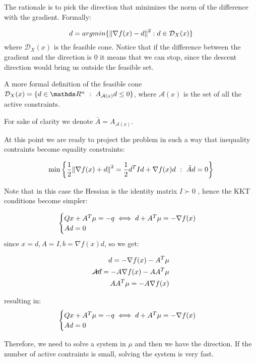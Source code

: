\documentclass[ComputationalMathematics.tex]{subfiles}
\begin{document}
The rationale is to pick the direction that minimizes the norm of the difference with the gradient. Formally:


\[
  d = argmin \{ {\left\lVert\nabla f(x) - d\right\rVert}^2: d \in \mathcal{D}_X(x)\}
\]
where $\mathcal{D}_X(x)$ is the feasible cone. Notice that if the difference between the gradient and the direction is $0$ it means that we can stop, since the descent direction would bring us outside the feasible set.

A more formal definition of the feasible cone $\mathcal{D}_X(x) = \{ d \in \R^n~:~A_{\mathcal{A}(x)}d \leq 0\}$, where $\mathcal{A}(x)$ is the set of all the active constraints.

For sake of clarity we denote $\bar{A} = A_{\mathcal{A}(x)}$.

At this point we are ready to project the problem in such a way that inequality contraints become equality constraints:

\[
  \min \bigg\{ \frac{1}{2} {\left\lVert\nabla f(x) + d\right\rVert}^2 = \frac{1}{2} {d}^{T} I d + \nabla f(x) d~:~\bar{A}d = 0\bigg\}
\]

Note that in this case the Hessian is the identity matrix $I \succ 0$
, hence the KKT conditions become simpler:

\[
  \begin{cases}
  Qx + {A}^{T} \mu = - q \iff d + A^T \mu = - \nabla f(x)\\
  A d = 0
  \end{cases}
\]
since $x=d, A=I, b= \nabla f(x) d$, so we get:

\begin{equation}
  \begin{split}
    d = - \nabla f(x) - A^T \mu\\
    \cancel{Ad} = - A \nabla f(x) - A A^T \mu\\
    A A^T \mu = - A \nabla f(x)
  \end{split}
\end{equation}

resulting in:
\[
  \begin{cases}
  Qx + {A}^{T} \mu = - q \iff d + A^T \mu = - \nabla f(x)\\
  A d = 0
  \end{cases}
\]


Therefore, we need to solve a system in $\mu$ and then we have the direction.
If the number of active contraints is small, solving the system is very fast.
\end{document}
